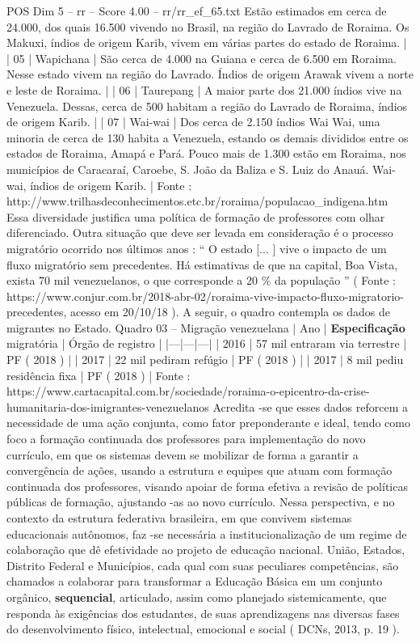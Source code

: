 \begin{textsample}{POS Dim 5 – rr – Score 4.00 – rr/rr\_ef\_65.txt}
Estão estimados em cerca de 24.000, dos quais 16.500 vivendo no Brasil, na região do Lavrado de Roraima.
Os Makuxi, índios de origem Karib, vivem em várias partes do estado de Roraima. | | 05 | Wapichana | São cerca de 4.000 na Guiana e cerca de 6.500 em Roraima.
Nesse estado vivem na região do Lavrado.
Índios de origem Arawak vivem a norte e leste de Roraima. | | 06 | Taurepang | A maior parte dos 21.000 índios vive na Venezuela.
Dessas, cerca de 500 habitam a região do Lavrado de Roraima, índios de origem Karib. | | 07 | Wai-wai | Dos cerca de 2.150 índios Wai Wai, uma minoria de cerca de 130 habita a Venezuela, estando os demais divididos entre os estados de Roraima, Amapá e Pará.
Pouco mais de 1.300 estão em Roraima, nos municípios de Caracaraí, Caroebe, S.
João da Baliza e S.
Luiz do Anauá.
Wai-wai, índios de origem Karib. | Fonte : http://www.trilhasdeconhecimentos.etc.br/roraima/populacao\_indigena.htm Essa diversidade justifica uma política de formação de professores com olhar diferenciado.
Outra situação que deve ser levada em consideração é o processo migratório ocorrido nos últimos anos : “ O estado [... ] vive o impacto de um fluxo migratório sem precedentes.
Há estimativas de que na capital, Boa Vista, exista 70 mil venezuelanos, o que corresponde a 20 \% da população ” ( Fonte : https://www.conjur.com.br/2018-abr-02/roraima-vive-impacto-fluxo-migratorio-precedentes, acesso em 20/10/18 ).
A seguir, o quadro contempla os dados de migrantes no Estado.
Quadro 03 – Migração venezuelana | Ano | \textbf{Especificação} migratória | Órgão de registro | |---|---|---| | 2016 | 57 mil entraram via terrestre | PF ( 2018 ) | | 2017 | 22 mil pediram refúgio | PF ( 2018 ) | | 2017 | 8 mil pediu residência fixa | PF ( 2018 ) | Fonte : https://www.cartacapital.com.br/sociedade/roraima-o-epicentro-da-crise-humanitaria-dos-imigrantes-venezuelanos Acredita -se que esses dados reforcem a necessidade de uma ação conjunta, como fator preponderante e ideal, tendo como foco a formação continuada dos professores para implementação do novo currículo, em que os sistemas devem se mobilizar de forma a garantir a convergência de ações, usando a estrutura e equipes que atuam com formação continuada dos professores, visando apoiar de forma efetiva a revisão de políticas públicas de formação, ajustando -as ao novo currículo.
Nessa perspectiva, e no contexto da estrutura federativa brasileira, em que convivem sistemas educacionais autônomos, faz -se necessária a institucionalização de um regime de colaboração que dê efetividade ao projeto de educação nacional.
União, Estados, Distrito Federal e Municípios, cada qual com suas peculiares competências, são chamados a colaborar para transformar a Educação Básica em um conjunto orgânico, \textbf{sequencial}, articulado, assim como planejado sistemicamente, que responda às exigências dos estudantes, de suas aprendizagens nas diversas fases do desenvolvimento físico, intelectual, emocional e social ( DCNs, 2013, p. 19 ).

\end{textsample}
